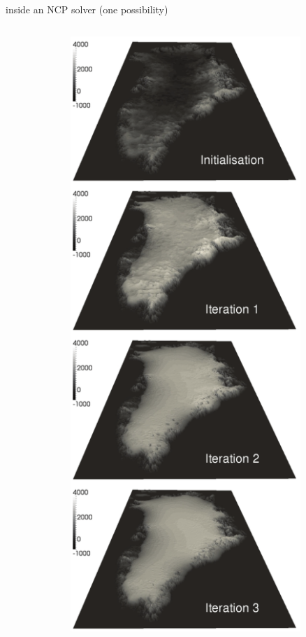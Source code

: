 \documentclass[10pt,hyperref,dvipsnames]{beamer}
\begin{document}
\begin{frame}{inside an NCP solver (one possibility)}
\begin{columns}
\begin{column}{0.7\textwidth}
\begin{itemize}
\end{itemize}
\end{column}
\begin{column}{0.3\textwidth}
\hfill \includegraphics[width=0.8\textwidth]{figs/GISsequence.png} \hfill
\end{column}
\end{columns}
\end{frame}
\end{document}
